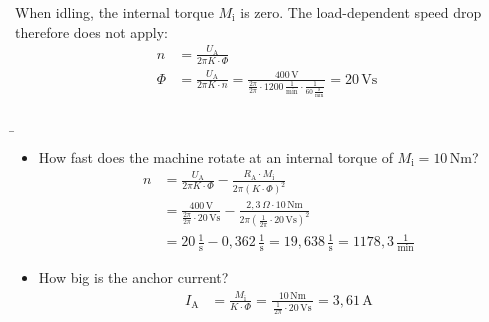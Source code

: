 \begin{frame}
{\begin{itemize}
				When idling, the internal torque $M_\mathrm{i}$ is zero. The load-dependent speed drop therefore does not apply:
				\begin{align*}
					n&=\frac{U_\mathrm{A}}{2\pi K\cdot \varPhi}\\
					\varPhi&=\frac{U_\mathrm{A}}{2\pi K\cdot n} = \frac{400\,\text{V}}{\frac{2\pi}{2\pi}\cdot 1200 \,\frac{1}{\text{min}}\cdot \frac{1}{60\,\frac{\text{s}}{\text{min}}}}  = 20\,\text{Vs}
				\end{align*}
		\end{itemize}	
	}
\end{frame}
\b{
	\begin{frame}
		\begin{itemize}
			\item[b)] How fast does the machine rotate at an internal torque of $M_\mathrm{i}=10\,\text{Nm}$?\pause
				\begin{align*}
					n &= \frac{U_\mathrm{A}}{2\pi K\cdot \varPhi} - \frac{R_\mathrm{A}\cdot M_\mathrm{i}}{2\pi(K\cdot \varPhi)^2}\\
					&= \frac{400\,\text{V}}{\frac{2\pi}{2\pi}\cdot 20\,\text{Vs}} - \frac{2,3\,\Omega \cdot 10\,\text{Nm}}{2\pi(\frac{1}{2\pi}\cdot 20\,\text{Vs})^2}\\
					&= 20\,\frac{1}{\text{s}} - 0,362 \,\frac{1}{\text{s}} = 19,638\,\frac{1}{\text{s}} =  1178,3\,\frac{1}{\text{min}}
				\end{align*}\pause
			\item[c)] How big is the anchor current?
				\begin{align*}
				I_\mathrm{A} &= \frac{M_\mathrm{i}}{K\cdot \varPhi} = \frac{10\,\text{Nm}}{\,\frac{1}{2\pi}\cdot 20\,\text{Vs}\,} = 3,61\,\text{A}
				\end{align*}
		\end{itemize}	
	\end{frame}
}




